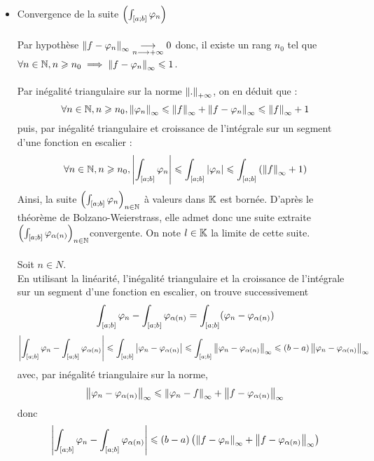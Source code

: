 \begin{dem}
    \begin{itemize}
        \item Convergence de la suite \(\left(\int_{\left[a;b\right]}\varphi_n\right)\)\\~\\
            Par hypothèse \(\left\|f - \varphi_n\right\|_{\infty} \underset{n\longrightarrow+\infty}{\longrightarrow} 0\) donc, il existe un rang \(n_0\) tel que \(\forall n \in \mathbb{N}, n \geqslant n_0 \implies \left\|f - \varphi_n\right\|_{\infty} \leqslant 1 \).\\~\\
            Par inégalité triangulaire sur la norme \(\left\| . \right\|_{+\infty}\), on en déduit que :
            \[\forall n \in \mathbb{N}, n \geqslant n_0, \left\|\varphi_n\right\|_{\infty} \leqslant \left\|f \right\|_{\infty} + \left\|f - \varphi_n\right\|_{\infty} \leqslant \left\|f \right\|_{\infty} + 1\]
            puis, par inégalité triangulaire et croissance de l’intégrale sur un segment d’une fonction en escalier :
            \[\forall n \in \mathbb{N}, n \geqslant n_0, \left\lvert\int_{\left[a;b\right]} \varphi_n\right\rvert \leqslant \int_{\left[a;b\right]}\left\lvert\varphi_n\right\rvert \leqslant\int_{\left[a;b\right]}\left(\left\|f \right\|_{\infty} + 1\right)\]
            Ainsi, la suite \(\left(\int_{\left[a;b\right]} \varphi_n\right)_{n\in \mathbb{N}}\) à valeurs dans \(\mathbb{K}\) est bornée. D’après le théorème de Bolzano-Weierstrass, elle admet donc une suite extraite \(\left(\int_{\left[a;b\right]}\varphi_{\alpha (n)}\right)_{n\in\mathbb{N}} \)convergente. On note \(l \in \mathbb{K}\) la limite de cette suite.\\~\\
            Soit \(n \in N\).\\
            En utilisant la linéarité, l’inégalité triangulaire et la croissance de l’intégrale sur un segment d’une fonction en escalier, on trouve successivement
            \[\int_{\left[a;b\right]}\varphi_n - \int_{\left[a;b\right]}\varphi_{\alpha (n)} =  \int _{\left[a;b\right]} (\varphi_n - \varphi_{\alpha (n)}) \]
            \[\left\lvert\int_{\left[a;b\right]}\varphi_n -\int_{\left[a;b\right]} \varphi_{\alpha (n)}\right\rvert\leqslant \int_{\left[a;b\right]}\left\lvert\varphi_n - \varphi_{\alpha (n)}\right\rvert \leqslant \int_{\left[a;b\right]}\left\|\varphi_n - \varphi_{\alpha (n)}\right\|_{\infty} \leqslant (b - a)\left\|\varphi_n - \varphi_{\alpha (n)}\right\|_{\infty}\]
            avec, par inégalité triangulaire sur la norme,
            \[ \left\|\varphi_n - \varphi_{\alpha (n)}\right\|_{\infty} \leqslant \left\|\varphi_n - f \right\|_{\infty} + \left\|f - \varphi_{\alpha (n)}\right\|_{\infty}\]
            donc 
            \[\left\lvert\int_{\left[a;b\right]} \varphi_n - \int_{\left[a;b\right]} \varphi_{\alpha (n)}\right\rvert \leqslant (b - a) \left(\left\|f - \varphi_n\right\|_{\infty} + \left\|f - \varphi_{\alpha (n)}\right\|_{\infty}\right)\]

\end{itemize}
\end{dem}
